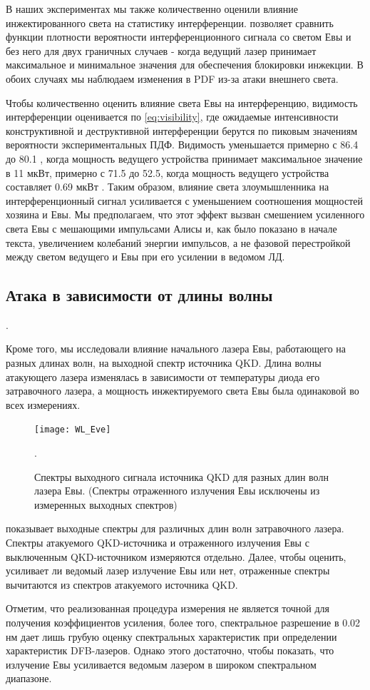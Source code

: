 В наших экспериментах мы также количественно оценили влияние инжектированного света на статистику интерференции.  позволяет сравнить функции плотности вероятности интерференционного сигнала со светом Евы и без него для двух граничных случаев - когда ведущий лазер принимает максимальное и минимальное значения для обеспечения блокировки инжекции. В обоих случаях мы наблюдаем изменения в PDF из-за атаки внешнего света.

Чтобы количественно оценить влияние света Евы на интерференцию, видимость интерференции оценивается по \cref{eq:visibility}, где ожидаемые интенсивности конструктивной и деструктивной интерференции берутся по пиковым значениям вероятности экспериментальных ПДФ. Видимость уменьшается примерно с 86.4 до 80.1 , когда мощность ведущего устройства принимает максимальное значение в 11 мкВт, примерно с 71.5 до 52.5, когда мощность ведущего устройства составляет 0.69 мкВт . Таким образом, влияние света злоумышленника на интерференционный сигнал усиливается с уменьшением соотношения мощностей хозяина и Евы. Мы предполагаем, что этот эффект вызван смешением усиленного света Евы с мешающими импульсами Алисы и, как было показано в начале текста, увеличением колебаний энергии импульсов, а не фазовой перестройкой между светом ведущего и Евы при его усилении в ведомом ЛД.
\subsection{Атака в зависимости от длины волны}.

Кроме того, мы исследовали влияние начального лазера Евы, работающего на разных длинах волн, на выходной спектр источника QKD. Длина волны атакующего лазера изменялась в зависимости от температуры диода его затравочного лазера, а мощность инжектируемого света Евы была одинаковой во всех измерениях.

\begin{figure}
\texttt{[image: WL\_Eve]}
\caption{Спектры выходного сигнала источника QKD для разных длин волн лазера Евы. (Спектры отраженного излучения Евы исключены из измеренных выходных спектров)}.
\label{fig:WL_Eve}
\end{figure}

 показывает выходные спектры для различных длин волн затравочного лазера. Спектры атакуемого QKD-источника и отраженного излучения Евы с выключенным QKD-источником измеряются отдельно. Далее, чтобы оценить, усиливает ли ведомый лазер излучение Евы или нет, отраженные спектры вычитаются из спектров атакуемого источника QKD.

Отметим, что реализованная процедура измерения не является точной для получения коэффициентов усиления, более того, спектральное разрешение в 0.02 нм  дает лишь грубую оценку спектральных характеристик при определении характеристик DFB-лазеров. Однако этого достаточно, чтобы показать, что излучение Евы усиливается ведомым лазером в широком спектральном диапазоне.

\section{}
